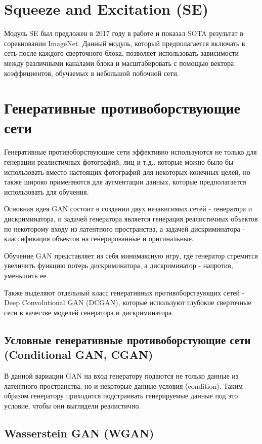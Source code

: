 \section{Squeeze and Excitation (SE)}

Модуль SE был предложен в 2017 году в работе \cite{hu2018squeeze} и показал SOTA результат в соревновании ImageNet. Данный модуль, который предполагается включать в сеть после каждого сверточного блока, позволяет использовать зависимости между различными каналами блока и масштабировать с помощью вектора коэффициентов, обучаемых в небольшой побочной сети.

\section{Генеративные противоборствующие сети}

Генеративные противоборствующие сети эффективно используются не только для генерации реалистичных фотографий, лиц и т.д., которые можно было бы использовать вместо настоящих фотографий для некоторых конечных целей, но также широко применяются для аугментации данных, которые предполагается использовать для обучения.

Основная идея GAN состоит в создании двух независимых сетей - генератора и дискриминатора, и задачей генератора является генерация реалистичных объектов по некоторому входу из латентного пространства, а задачей дискриминатора - классификация объектов на генерированные и оригинальные.

Обучение GAN представляет из себя минимаксную игру, где генератор стремится увеличить функцию потерь дискриминатора, а дискриминатор - напротив, уменьшить ее.

Также выделяют отдельный класс генеративных противоборствующих сетей - Deep Convolutional GAN (DCGAN), которые используют глубокие сверточные сети в качестве моделей генератора и дискриминатора.

\subsection{Условные генеративные противоборстующие сети (Conditional GAN, CGAN)}

В данной вариации GAN на вход генератору подаются не только данные из латентного пространства, но и некоторые данные условия (condition). Таким образом генератору приходится подстраивать генерируемые данные под это условие, чтобы они выглядели реалистично.

\subsection{Wasserstein GAN (WGAN) \cite{arjovsky2017wasserstein}}

